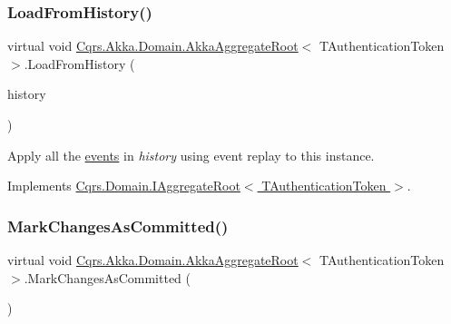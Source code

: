 \subsubsection{\texorpdfstring{Load\+From\+History()}{LoadFromHistory()}}
{\footnotesize\ttfamily virtual void \hyperlink{classCqrs_1_1Akka_1_1Domain_1_1AkkaAggregateRoot}{Cqrs.\+Akka.\+Domain.\+Akka\+Aggregate\+Root}$<$ T\+Authentication\+Token $>$.Load\+From\+History (\begin{DoxyParamCaption}\item[{I\+Enumerable$<$ \hyperlink{interfaceCqrs_1_1Events_1_1IEvent}{I\+Event}$<$ T\+Authentication\+Token $>$$>$}]{history }\end{DoxyParamCaption})\hspace{0.3cm}{\ttfamily [virtual]}}



Apply all the \hyperlink{}{events} in {\itshape history}  using event replay to this instance. 



Implements \hyperlink{interfaceCqrs_1_1Domain_1_1IAggregateRoot_afe9329ee26ae68613059189ca64dfe60_afe9329ee26ae68613059189ca64dfe60}{Cqrs.\+Domain.\+I\+Aggregate\+Root$<$ T\+Authentication\+Token $>$}.

\mbox{\label{classCqrs_1_1Akka_1_1Domain_1_1AkkaAggregateRoot_a0d2615067175e5f8249bb2dc3d17ee0b_a0d2615067175e5f8249bb2dc3d17ee0b}} 
\subsubsection{\texorpdfstring{Mark\+Changes\+As\+Committed()}{MarkChangesAsCommitted()}}
{\footnotesize\ttfamily virtual void \hyperlink{classCqrs_1_1Akka_1_1Domain_1_1AkkaAggregateRoot}{Cqrs.\+Akka.\+Domain.\+Akka\+Aggregate\+Root}$<$ T\+Authentication\+Token $>$.Mark\+Changes\+As\+Committed (\begin{DoxyParamCaption}{ }\end{DoxyParamCaption})\hspace{0.3cm}{\ttfamily [virtual]}}



